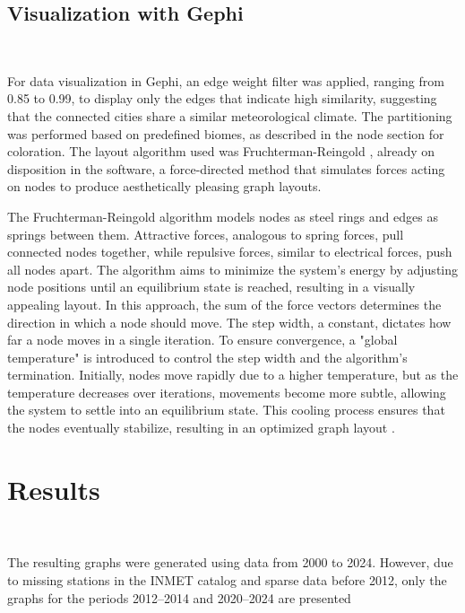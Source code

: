 \documentclass[conference]{IEEEtran}
\begin{document}
\subsection{Visualization with Gephi}

\

For data visualization in Gephi, an edge weight filter was applied, ranging from 0.85 to 0.99, to display only the edges that indicate high similarity, suggesting that the connected cities share a similar meteorological climate. The partitioning was performed based on predefined biomes, as described in the node section for coloration. The layout algorithm used was Fruchterman-Reingold \cite{fruchterman1991graph}, already on disposition in the software, a force-directed method that simulates forces acting on nodes to produce aesthetically pleasing graph layouts.

The Fruchterman-Reingold algorithm models nodes as steel rings and edges as springs between them. Attractive forces, analogous to spring forces, pull connected nodes together, while repulsive forces, similar to electrical forces, push all nodes apart. The algorithm aims to minimize the system's energy by adjusting node positions until an equilibrium state is reached, resulting in a visually appealing layout. In this approach, the sum of the force vectors determines the direction in which a node should move. The step width, a constant, dictates how far a node moves in a single iteration. To ensure convergence, a "global temperature" is introduced to control the step width and the algorithm's termination. Initially, nodes move rapidly due to a higher temperature, but as the temperature decreases over iterations, movements become more subtle, allowing the system to settle into an equilibrium state. This cooling process ensures that the nodes eventually stabilize, resulting in an optimized graph layout \cite{fruchterman1991graph}.

\section{Results}

\

The resulting graphs were generated using data from 2000 to 2024. However, due to missing stations in the INMET catalog and sparse data before 2012, only the graphs for the periods 2012–2014 and 2020–2024 are presented
\end{document}
